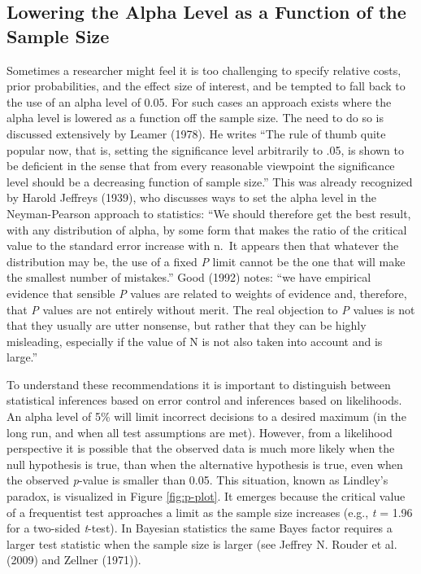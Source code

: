 \documentclass[
  english,
  ,jou,floatsintext]{apa6}
\begin{document}
\hypertarget{lowering-the-alpha-level-as-a-function-of-the-sample-size}{%
\subsection{Lowering the Alpha Level as a Function of the Sample Size}\label{lowering-the-alpha-level-as-a-function-of-the-sample-size}}

Sometimes a researcher might feel it is too challenging to specify relative costs, prior probabilities, and the effect size of interest, and be tempted to fall back to the use of an alpha level of 0.05. For such cases an approach exists where the alpha level is lowered as a function off the sample size. The need to do so is discussed extensively by Leamer (1978). He writes ``The rule of thumb quite popular now, that is, setting the significance level arbitrarily to .05, is shown to be deficient in the sense that from every reasonable viewpoint the significance level should be a decreasing function of sample size.'' This was already recognized by Harold Jeffreys (1939), who discusses ways to set the alpha level in the Neyman-Pearson approach to statistics: ``We should therefore get the best result, with any distribution of alpha, by some form that makes the ratio of the critical value to the standard error increase with n.~It appears then that whatever the distribution may be, the use of a fixed \emph{P} limit cannot be the one that will make the smallest number of mistakes.'' Good (1992) notes: ``we have empirical evidence that sensible \emph{P} values are related to weights of evidence and, therefore, that \emph{P} values are not entirely without merit. The real objection to \emph{P} values is not that they usually are utter nonsense, but rather that they can be highly misleading, especially if the value of N is not also taken into account and is large.''

To understand these recommendations it is important to distinguish between statistical inferences based on error control and inferences based on likelihoods. An alpha level of 5\% will limit incorrect decisions to a desired maximum (in the long run, and when all test assumptions are met). However, from a likelihood perspective it is possible that the observed data is much more likely when the null hypothesis is true, than when the alternative hypothesis is true, even when the observed \emph{p}-value is smaller than 0.05. This situation, known as Lindley's paradox, is visualized in Figure \ref{fig:p-plot}. It emerges because the critical value of a frequentist test approaches a limit as the sample size increases (e.g., \emph{t} = 1.96 for a two-sided \emph{t}-test). In Bayesian statistics the same Bayes factor requires a larger test statistic when the sample size is larger (see Jeffrey N. Rouder et al. (2009) and Zellner (1971)).
\end{document}
